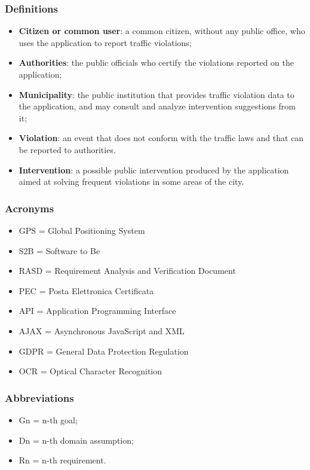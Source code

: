 \subsubsection{Definitions}
	\begin{itemize}
		\item \textbf{Citizen or common user}: a common citizen, without any public office, who uses the application to report traffic violations;
		\item \textbf{Authorities}: the public officials who certify the violations reported on the application;
		\item \textbf{Municipality}: the public institution that provides traffic violation data to the application, and may consult and analyze intervention suggestions from it;
		\item \textbf{Violation}: an event that does not conform with the traffic laws and that can be reported to authorities.
		\item \textbf{Intervention}: a possible public intervention produced by the application aimed at solving frequent violations in some areas of the city.
	\end{itemize}
\subsubsection{Acronyms}
\begin{itemize}
	\item GPS = Global Positioning System
	\item S2B = Software to Be
	\item RASD = Requirement Analysis and Verification Document
	\item PEC = Posta Elettronica Certificata
	\item API = Application Programming Interface
	\item AJAX = Asynchronous JavaScript and XML
	\item GDPR = General Data Protection Regulation
	\item OCR = Optical Character Recognition
\end{itemize}
\subsubsection{Abbreviations}
\begin{itemize}
	\item Gn = n-th goal;
	\item Dn = n-th domain assumption;
	\item Rn = n-th requirement.
\end{itemize}